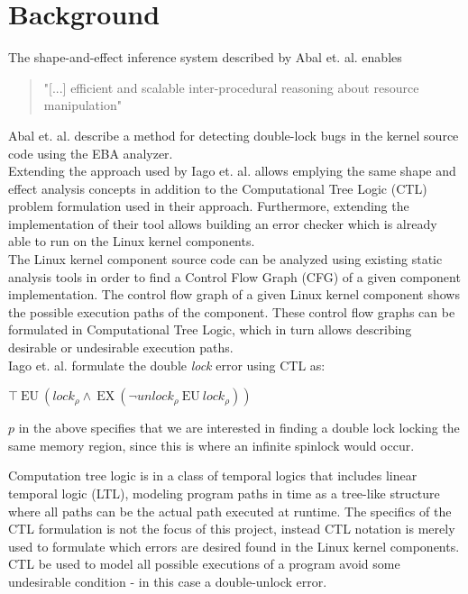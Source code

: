 \section{Background}

The shape-and-effect inference system described by Abal et. al. \cite{Abal2017EffectiveBF} enables \begin{quote}
    "[...] efficient and scalable inter-procedural reasoning about resource manipulation"
\end{quote}
 
\noindent Abal et. al. describe a method for detecting double-lock bugs in the kernel source code using the EBA analyzer. \\

\noindent Extending the approach used by Iago et. al. allows emplying the same shape and effect analysis concepts in addition to the Computational Tree Logic (CTL) problem formulation used in their approach. Furthermore, extending the implementation of their tool allows building an error checker which is already able to run on the Linux kernel components. \\

\noindent The Linux kernel component source code can be analyzed using existing static analysis tools in order to find a Control Flow Graph (CFG) of a given component implementation. The control flow graph of a given Linux kernel component shows the possible execution paths of the component. These control flow graphs can be formulated in Computational Tree Logic, which in turn allows describing desirable or undesirable execution paths.  \\

\noindent Iago et. al. formulate the double \textit{lock} error using CTL as: 

\begin{center}
    $\top\:\mathrm{EU}\:\left({l o c k}_{\rho} \wedge\:\mathrm{EX}\:\left(\neg {u n l o c k}_{\rho}\:\mathrm{EU}\:{l o c k}_{\rho}\right)\right)$
\end{center}

\noindent $p$ in the above specifies that we are interested in finding a double lock locking the same memory region, since this is where an infinite spinlock would occur. 

\noindent Computation tree logic is in a class of temporal logics that includes linear temporal logic (LTL), modeling program paths in time as a tree-like structure where all paths can be the actual path executed at runtime. The specifics of the CTL formulation is not the focus of this project, instead CTL notation is merely used to formulate which errors are desired found in the Linux kernel components. CTL be used to model all possible executions of a program avoid some undesirable condition - in this case a double-unlock error. \\

